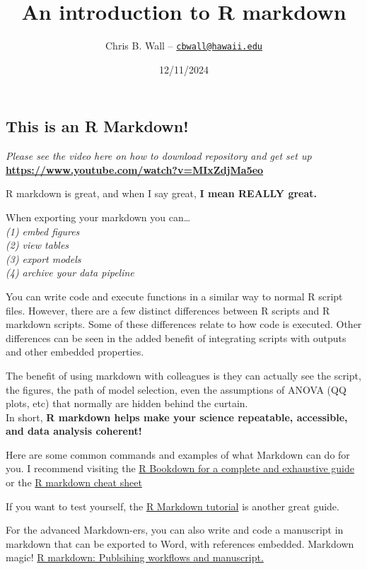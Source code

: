 \documentclass[
]{article}
\title{An introduction to R markdown}
\author{Chris B. Wall --
\href{mailto:cbwall@hawaii.edu}{\nolinkurl{cbwall@hawaii.edu}}}
\date{12/11/2024}
\begin{document}
\maketitle

{
\setcounter{tocdepth}{3}
\tableofcontents
}
\hypertarget{this-is-an-r-markdown}{%
\subsection{This is an R Markdown!}\label{this-is-an-r-markdown}}

\emph{Please see the video here on how to download repository and get
set up} \textbf{\url{https://www.youtube.com/watch?v=MIxZdjMa5eo}}

R markdown is great, and when I say great, \textbf{I mean REALLY great.}

When exporting your markdown you can\ldots{}\\
\emph{(1) embed figures}\\
\emph{(2) view tables}\\
\emph{(3) export models}\\
\emph{(4) archive your data pipeline}

You can write code and execute functions in a similar way to normal R
script files. However, there are a few distinct differences between R
scripts and R markdown scripts. Some of these differences relate to how
code is executed. Other differences can be seen in the added benefit of
integrating scripts with outputs and other embedded properties.

The benefit of using markdown with colleagues is they can actually see
the script, the figures, the path of model selection, even the
assumptions of ANOVA (QQ plots, etc) that normally are hidden behind the
curtain.\\
In short, \textbf{R markdown helps make your science repeatable,
accessible, and data analysis coherent!}

Here are some common commands and examples of what Markdown can do for
you. I recommend visiting the
\href{https://bookdown.org/yihui/rmarkdown/}{R Bookdown for a complete
and exhaustive guide} or the
\href{https://www.rstudio.com/wp-content/uploads/2015/02/rmarkdown-cheatsheet.pdf}{R
markdown cheat sheet}

If you want to test yourself, the
\href{https://www.markdowntutorial.com/}{R Markdown tutorial} is another
great guide.

For the advanced Markdown-ers, you can also write and code a manuscript
in markdown that can be exported to Word, with references embedded.
Markdown magic!
\href{https://danovando.github.io/publications-with-rmarkdown/presentations/pubs-with-rmarkdown}{R
markdown: Publsihing workflows and manuscript.}
\end{document}

